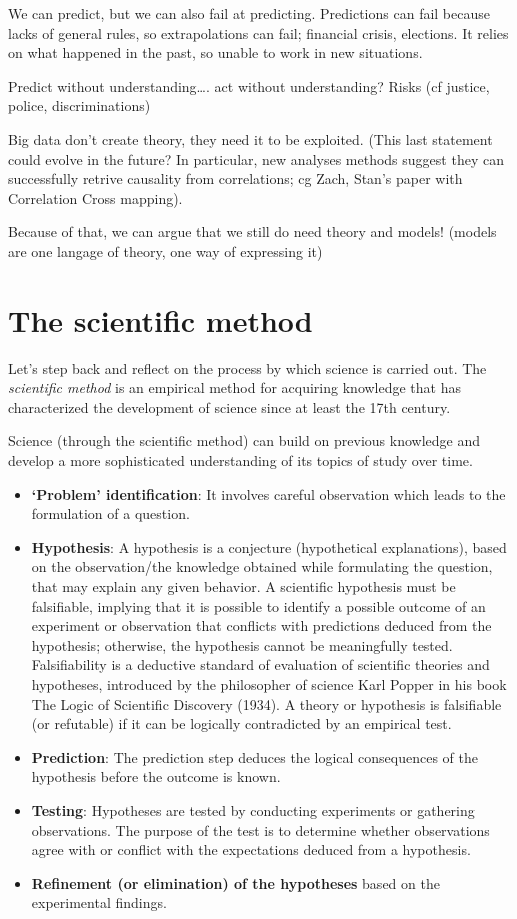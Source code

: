\documentclass[
]{book}
\theoremstyle{definition}
\theoremstyle{definition}
\theoremstyle{definition}
\theoremstyle{definition}
\theoremstyle{remark}
\begin{document}
We can predict, but we can also fail at predicting. Predictions can fail because lacks of general rules, so extrapolations can fail; financial crisis, elections. It relies on what happened in the past, so unable to work in new situations.

Predict without understanding\ldots. act without understanding? Risks (cf justice, police, discriminations)

Big data don't create theory, they need it to be exploited. (This last statement could evolve in the future? In particular, new analyses methods suggest they can successfully retrive causality from correlations; cg Zach, Stan's paper with Correlation Cross mapping).

Because of that, we can argue that we still do need theory and models! (models are one langage of theory, one way of expressing it)

\section{The scientific method}\label{the-scientific-method}

Let's step back and reflect on the process by which science is carried out. The \emph{scientific method} is an empirical method for acquiring knowledge that has characterized the development of science since at least the 17th century.

Science (through the scientific method) can build on previous knowledge and develop a more sophisticated understanding of its topics of study over time.

\begin{itemize}
\item
  \textbf{`Problem' identification}: It involves careful observation which leads to the formulation of a question.
\item
  \textbf{Hypothesis}: A hypothesis is a conjecture (hypothetical explanations), based on the observation/the knowledge obtained while formulating the question, that may explain any given behavior. A scientific hypothesis must be falsifiable, implying that it is possible to identify a possible outcome of an experiment or observation that conflicts with predictions deduced from the hypothesis; otherwise, the hypothesis cannot be meaningfully tested.
  Falsifiability is a deductive standard of evaluation of scientific theories and hypotheses, introduced by the philosopher of science Karl Popper in his book The Logic of Scientific Discovery (1934).
  A theory or hypothesis is falsifiable (or refutable) if it can be logically contradicted by an empirical test.
\item
  \textbf{Prediction}: The prediction step deduces the logical consequences of the hypothesis before the outcome is known.
\item
  \textbf{Testing}: Hypotheses are tested by conducting experiments or gathering observations. The purpose of the test is to determine whether observations agree with or conflict with the expectations deduced from a hypothesis.
\item
  \textbf{Refinement (or elimination) of the hypotheses} based on the experimental findings.
\end{itemize}
\end{document}
